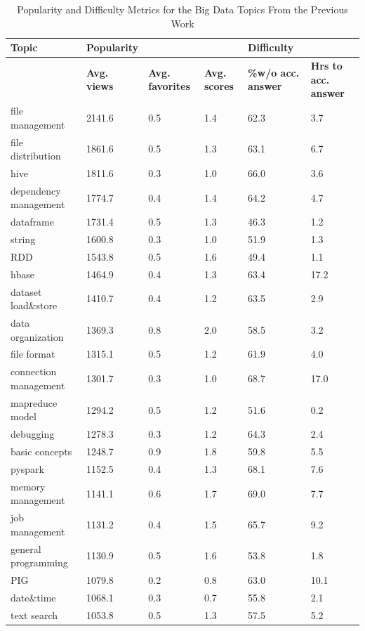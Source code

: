\begin{table}[tbp]
\caption{Popularity and Difficulty Metrics for the Big Data Topics From the Previous Work \cite{bagherzadeh2019going}}
\label{BP}
\centering
\begin{tabular}{p{1.4in}p{.5in}p{.6in}p{.4in}p{.9in}p{.9in}} \hline
\textbf{Topic} & \textbf{Popularity} & & & \textbf{Difficulty} \\ \hline
& \textbf{Avg. views} & \textbf{Avg. favorites} & \textbf{Avg. scores} & \textbf{\%w/o acc. answer} & \textbf{Hrs to acc. answer}\\ \hline
file management & 2141.6 & 0.5 & 1.4 & 62.3 & 3.7 \\
file distribution & 1861.6 & 0.5 & 1.3 & 63.1 & 6.7 \\
hive & 1811.6 & 0.3 & 1.0 & 66.0 & 3.6\\
dependency management & 1774.7 & 0.4 & 1.4 & 64.2 & 4.7\\
dataframe & 1731.4 & 0.5 & 1.3 & 46.3 & 1.2 \\
string & 1600.8 & 0.3 & 1.0 & 51.9 & 1.3\\
RDD & 1543.8 & 0.5 & 1.6 & 49.4 & 1.1\\
hbase & 1464.9 & 0.4 & 1.3 & 63.4 & 17.2 \\
dataset load\&store & 1410.7 & 0.4 & 1.2 & 63.5 & 2.9\\
data organization & 1369.3 & 0.8 & 2.0 & 58.5 & 3.2\\
file format & 1315.1 & 0.5 & 1.2 & 61.9 & 4.0\\
connection management & 1301.7 & 0.3 & 1.0 & 68.7 & 17.0\\
mapreduce model & 1294.2 & 0.5 & 1.2 & 51.6 & 0.2\\
debugging & 1278.3 & 0.3 & 1.2 & 64.3 & 2.4\\
basic concepts & 1248.7 & 0.9 & 1.8 & 59.8 & 5.5\\
pyspark & 1152.5 & 0.4 & 1.3 & 68.1 & 7.6 \\
memory management & 1141.1 & 0.6 & 1.7 & 69.0 & 7.7 \\
job management & 1131.2 & 0.4 & 1.5 & 65.7 & 9.2 \\
general programming & 1130.9 & 0.5 & 1.6 & 53.8 & 1.8\\
PIG & 1079.8 & 0.2 & 0.8 & 63.0 & 10.1 \\
date\&time & 1068.1 & 0.3 & 0.7 & 55.8 & 2.1 \\
text search & 1053.8 & 0.5 & 1.3 & 57.5 & 5.2\\

\end{tabular}
\end{table}
